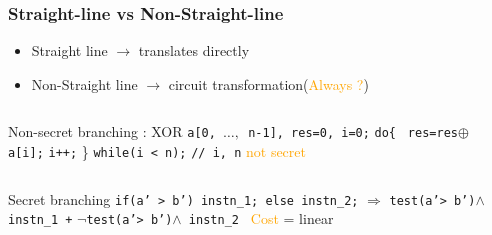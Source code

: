 \documentclass{beamer}
\begin{document}
\begin{frame} \frametitle{ Straight-line vs Non-Straight-line}
  \begin{itemize}
  \item Straight line $\rightarrow$ translates directly
  \item Non-Straight line $\rightarrow$ circuit transformation(\textcolor{orange}{Always ?})
  \end{itemize}
\pause
\begin{columns}
\begin{column}[c]{9cm}
\begin{exampleblock}{Non-secret branching : XOR}
\texttt{a[0, $\ldots,$ n-1], res=0, i=0;}
\newline \phantom{x} \texttt{do\{ }
\newline \phantom{x} \hspace{9ex} \texttt{res=res$\oplus$a[i];}
\newline \phantom{x} \hspace{9ex} \texttt{i++;} 
\newline   \phantom{x} \} \texttt{while(i < n);} \phantom{x} \hspace{9ex}\texttt{// i, n} \textcolor{orange}{not secret}
\end{exampleblock}
\end{column}
\begin{column}[c]{2cm}

\end{column}
\end{columns} 
\pause
\begin{alertblock}{Secret branching}
\texttt{if(a' > b') instn\_1; else instn\_2;}
\newline   \phantom{x}  \hspace{8ex} $\Rightarrow$ \texttt{test(a'> b')$\wedge$} \texttt{instn\_1 +} $\neg$\texttt{test(a'> b')$\wedge$ instn\_2 }
\newline \textcolor{orange}{Cost} = linear
\end{alertblock}
\end{frame}
\end{document}
